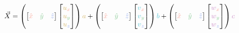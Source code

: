 \documentclass[preview]{standalone}
\begin{document}
$$\vec{X} =
\left(\begin{bmatrix}\textcolor[HTML]{f9a598}{\hat{x}}&\textcolor[HTML]{87c993}{\hat{y}}&\textcolor[HTML]{94acef}{\hat{z}}\end{bmatrix}\begin{bmatrix}\textcolor[HTML]{d4b76b}{u}_{\textcolor[HTML]{f9a598}{x}}\\\textcolor[HTML]{d4b76b}{u}_{\textcolor[HTML]{87c993}{y}}\\\textcolor[HTML]{d4b76b}{u}_{\textcolor[HTML]{94acef}{z}}\end{bmatrix}\right)\textcolor[HTML]{d4b76b}{a} +
\left(\begin{bmatrix}\textcolor[HTML]{f9a598}{\hat{x}}&\textcolor[HTML]{87c993}{\hat{y}}&\textcolor[HTML]{94acef}{\hat{z}}\end{bmatrix}\begin{bmatrix}\textcolor[HTML]{58c4d5}{v}_{\textcolor[HTML]{f9a598}{x}}\\\textcolor[HTML]{58c4d5}{v}_{\textcolor[HTML]{87c993}{y}}\\\textcolor[HTML]{58c4d5}{v}_{\textcolor[HTML]{94acef}{z}}\end{bmatrix}\right)\textcolor[HTML]{58c4d5}{b} +
\left(\begin{bmatrix}\textcolor[HTML]{f9a598}{\hat{x}}&\textcolor[HTML]{87c993}{\hat{y}}&\textcolor[HTML]{94acef}{\hat{z}}\end{bmatrix}\begin{bmatrix}\textcolor[HTML]{ce93ca}{w}_{\textcolor[HTML]{f9a598}{x}}\\\textcolor[HTML]{ce93ca}{w}_{\textcolor[HTML]{87c993}{y}}\\\textcolor[HTML]{ce93ca}{w}_{\textcolor[HTML]{94acef}{z}}\end{bmatrix}\right)\textcolor[HTML]{ce93ca}{c}$$
\end{document}
